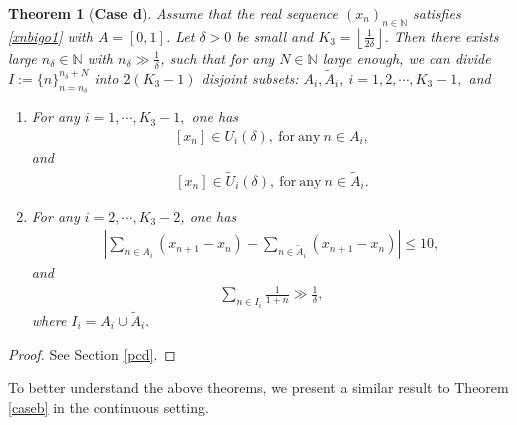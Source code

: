 \documentclass[12pt]{amsart}
\newcommand{\abs}[1]{\left\lvert #1 \right\rvert}
\theoremstyle{plain}
\newtheorem{theorem}{Theorem}[section]
\theoremstyle{definition}
\begin{document}
\begin{theorem}[\textbf{Case d}]\label{cased}
 Assume that the real sequence $(x_n)_{n\in\mathbb{N}}$ satisfies \eqref{xnbigo1} with $A=[0,1]$. Let $\delta>0$ be small and $K_3=\left \lfloor \frac{1}{2\delta} \right \rfloor$. Then there exists large $n_\delta\in\mathbb{N}$ with $n_\delta\gg \frac{1}{\delta}$, such that for any $N\in\mathbb{N}$ large enough, we can divide $I:=\{n\}_{n=n_\delta}^{n_\delta+N}$ into $2(K_3-1)$ disjoint subsets: $A_i, \tilde{{A}}_i,\ i=1,2,\cdots,K_3-1,$ 
and
\begin{enumerate}
\item For any $i=1,\cdots,K_3-1,$ one has
\begin{align}
	\left[x_n\right]\in U_i(\delta),\ \mathrm{for\ any\ } n\in A_i,\label{aiinui}
\end{align}
and
\begin{align}
	\left[x_n\right]\in \tilde{U}_i(\delta),\ \mathrm{for\ any\ } n\in \tilde{A}_i.\label{aiinuitilde}
\end{align}
\item For any $i=2,\cdots,K_3-2$, one has
\begin{align}
	\abs{\sum_{n\in A_i}(x_{n+1}-x_n)-\sum_{n\in \tilde{A}_i}(x_{n+1}-x_n)}\leq 10,\label{aiminusbileq10}
\end{align}
and 
\begin{align}
\sum_{n\in I_i}\frac{1}{1+n}\gg \frac{1}{\delta},\label{Iifractionlarge}
\end{align}
where $I_i=A_i\cup \tilde{{A}}_i.$ 
\end{enumerate}
\end{theorem}
\begin{proof}
	See Section \ref{pcd}.
\end{proof}

To better understand the above theorems, we present a similar result to Theorem \ref{caseb} in the continuous setting.
\end{document}
